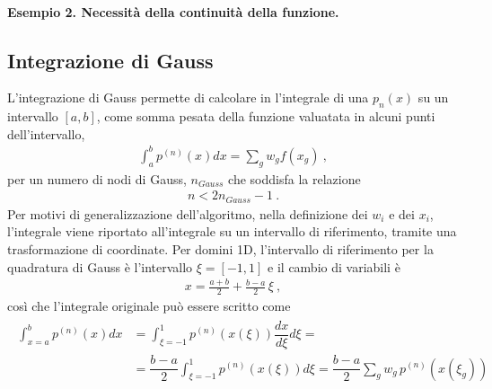 \documentclass[letterpaper,10pt,english]{jupyterBook}
\begin{document}
\paragraph{Esempio 2. Necessità della continuità della funzione.}
\label{\detokenize{ch/numerics/integrals:esempio-2-necessita-della-continuita-della-funzione}}\label{\detokenize{ch/numerics/integrals:integrals-examples-continuity}}



\subsection{Integrazione di Gauss}
\label{\detokenize{ch/numerics/integrals:integrazione-di-gauss}}
\sphinxAtStartPar
L’integrazione di Gauss permette di calcolare in  l’integrale di una  \(p_n(x)\) su un intervallo \([a,b]\), come somma pesata della funzione valuatata in alcuni punti dell’intervallo,
\begin{equation*}
\begin{split}\int_a^b p^{(n)}(x) dx = \sum_{g} w_g f(x_g) \ ,\end{split}
\end{equation*}
\sphinxAtStartPar
per un numero di nodi di Gauss, \(n_{Gauss}\) che soddisfa la relazione
\begin{equation*}
\begin{split}n < 2 n_{Gauss} - 1 \ .\end{split}
\end{equation*}
\sphinxAtStartPar
Per motivi di generalizzazione dell’algoritmo, nella definizione dei  \(w_i\) e dei  \(x_i\), l’integrale viene riportato all’integrale su un intervallo di riferimento, tramite una trasformazione di coordinate.
Per domini 1D, l’intervallo di riferimento per la quadratura di Gauss è l’intervallo \(\xi = [-1, 1]\) e il cambio di variabili è
\begin{equation*}
\begin{split}x = \frac{a+b}{2} + \frac{b-a}{2} \, \xi \ ,\end{split}
\end{equation*}
\sphinxAtStartPar
così che l’integrale originale può essere scritto come
\begin{equation*}
\begin{split}\begin{aligned}
\int_{x=a}^b p^{(n)}(x) dx & = \int_{\xi = -1}^{1} p^(n) (x(\xi)) \dfrac{d x}{d\xi} d \xi = \\
 & = \dfrac{b-a}{2} \int_{\xi=-1}^{1} p^{(n)}(x(\xi)) d \xi = \dfrac{b-a}{2} \sum_{g} w_g \, p^{(n)}\left(x(\xi_g)\right)
\end{aligned}\end{split}
\end{equation*}
\end{document}
